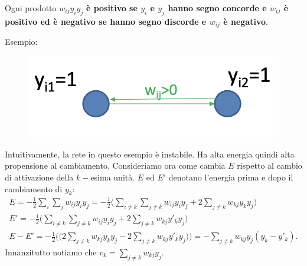 Ogni prodotto $w_{ij}y_iy_j$ \textbf{è positivo se $y_i$ e $y_j$ hanno segno concorde e $w_{ij}$ è positivo ed è negativo se hanno segno discorde e $w_{ij}$ è negativo}.


Esempio:
\begin{figure}[!h]
    \includegraphics[scale=.5]{images/hopfield_networks/ex04.png}
    \centering
\end{figure}


Intuitivamente, la rete in questo esempio è instabile. Ha alta energia quindi alta propensione al cambiamento.
\newline
\newline
Consideriamo ora come cambia $E$ rispetto al cambio di attivazione della $k-$esima unità. $E$ ed $E'$ denotano l'energia prima e dopo il cambiamento di $y_k$:
\begin{equation}
    \begin{split}
        E=-\frac{1}{2}\sum_i\sum_jw_{ij}y_iy_j =-\frac{1}{2}\Big( \sum_{i\neq k}\sum_{j\neq k}w_{ij}y_iy_j + 2 \sum_{j\neq k}w_{kj}y_ky_j \Big)\\
        E'=-\frac{1}{2}\Big( \sum_{i\neq k}\sum_{j\neq k}w_{ij}y_iy_j + 2 \sum_{j\neq k}w_{kj}y'_ky_j \Big)\\
        E-E'=-\frac{1}{2}\Big(\Big(2\sum_{j\neq k}w_{kj}y_ky_j-2\sum_{j\neq k} w_{kj}y'_ky_j\Big)\Big)=-\sum_{j\neq k}w_{kj}y_j(y_k-y'_k).
    \end{split}
\end{equation}
\newpage
Innanzitutto notiamo che  $v_k=\sum_{j\neq k}w_{kj}y_j$.


